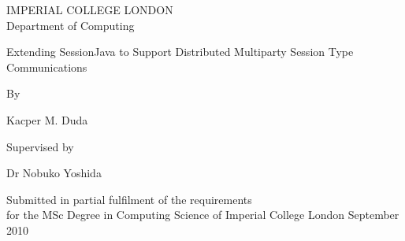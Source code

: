 \begin{titlepage}
\begin{center}
\vspace{4in}
{\begin{large}IMPERIAL COLLEGE LONDON \\ Department of Computing\end{large}}
\vskip 3in
{\begin{huge}Extending SessionJava to Support Distributed Multiparty Session Type Communications\end{huge}}
\vskip 1in
{By\\\begin{large} Kacper M. Duda\end{large}}
\vskip 1in
{Supervised by \\\begin{large}Dr Nobuko Yoshida\end{large}}
\vskip 1in
{Submitted in partial fulfilment of the requirements\\for the MSc Degree in Computing Science of Imperial College London}
\vfill
September 2010
\end{center}
\end{titlepage}